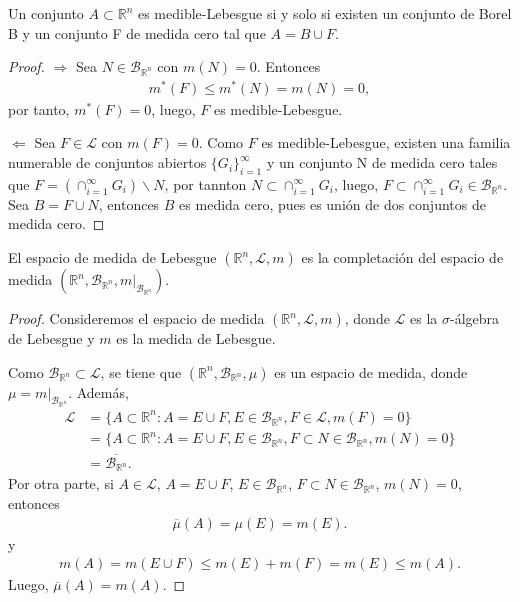 \begin{cor}
    Un conjunto $A \subset \mathbb{R}^n$ es medible-Lebesgue si y solo si existen un conjunto de Borel B y un conjunto F de medida cero tal que $A = B \cup F$.
\end{cor}

\begin{proof}
    $\Longrightarrow$ Sea $N \in \mathcal{B}_{\mathbb{R}^n}$ con $m(N) = 0$. Entonces
    \begin{align*}
        m^*(F) \leq m^*(N) = m(N) = 0,
    \end{align*}
    por tanto, $m^*(F) = 0$, luego, $F$ es medible-Lebesgue.

    $\Longleftarrow$ Sea $F \in \mathcal{L}$ con $m(F) = 0$. Como $F$ es medible-Lebesgue, existen una familia numerable de conjuntos abiertos $\{G_i\}_{i=1}^{\infty}$ y un conjunto N de medida cero tales que $F = (\cap_{i=1}^{\infty}{G_i}) \backslash N$, por tannton $N \subset \cap_{i=1}^{\infty}{G_i}$, luego, $F \subset \cap_{i=1}^{\infty}{G_i} \in \mathcal{B}_{\mathbb{R}^n}$. Sea $B = F \cup N$, entonces $B$ es medida cero, pues es unión de dos conjuntos de medida cero.
\end{proof}

\begin{cor}
    El espacio de medida de Lebesgue $(\mathbb{R}^n, \mathcal{L}, m)$ es la completación del espacio de medida $(\mathbb{R}^n, \mathcal{B}_{\mathbb{R}^n}, m|_{\mathcal{B}_{\mathbb{R}^n}})$.
\end{cor}

\begin{proof}
    Consideremos el espacio de medida $(\mathbb{R}^n, \mathcal{L}, m)$, donde $\mathcal{L}$ es la $\sigma$-álgebra de Lebesgue y $m$ es la medida de Lebesgue.

    Como $\mathcal{B}_{\mathbb{R}^n} \subset \mathcal{L}$, se tiene que $(\mathbb{R}^n, \mathcal{B}_{\mathbb{R}^n}, \mu)$ es un espacio de medida, donde $\mu =  m|_{\mathcal{B}_{\mathbb{R}^n}}$. Además,
    \begin{align*}
        \mathcal{L} & = \{ A \subset \mathbb{R}^n : A = E \cup F, E \in \mathcal{B}_{\mathbb{R}^n}, F \in \mathcal{L}, m(F) = 0\}                          \\
                    & = \{ A \subset \mathbb{R}^n : A = E \cup F, E \in \mathcal{B}_{\mathbb{R}^n}, F \subset N \in \mathcal{B}_{\mathbb{R}^n}, m(N) = 0\} \\
                    & = \overline{\mathcal{B}_{\mathbb{R}^n}}.
    \end{align*}
    Por otra parte, si $A \in \mathcal{L}$, $A = E \cup F$, $E \in \mathcal{B}_{\mathbb{R}^n}$, $F \subset N \in \mathcal{B}_{\mathbb{R}^n}$, $m(N) = 0$, entonces
    \begin{align*}
        \overline{\mu}(A) = \mu(E) = m(E).
    \end{align*}
    y
    \begin{align*}
        m(A) = m(E \cup F) \leq m(E) + m(F) = m(E) \leq m(A).
    \end{align*}
    Luego, $\overline{\mu}(A) = m(A)$.
\end{proof}

